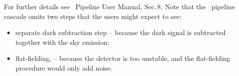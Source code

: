 For further details see \instname\ Pipeline User Manual, Sec.\,8.
Note that the \instname\ pipeline cascade omits two steps that 
the users might expect to see:
\begin{itemize}
\item separate dark subtraction step -- because the dark signal 
is subtracted together with the sky emission;
\item flat-fielding, -- because the detector is too unstable, 
and the flat-fielding procedure would only add noise.
\end{itemize}
